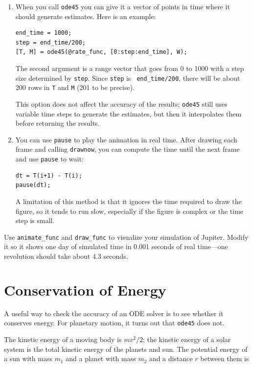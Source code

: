 \documentclass{book}
\begin{document}
\begin{enumerate}

\item When you call {\tt ode45} you can give it a vector of
points in time where it should generate estimates.  Here is
an example:

\begin{verbatim}
end_time = 1000;
step = end_time/200;
[T, M] = ode45(@rate_func, [0:step:end_time], W);
\end{verbatim}

The second argument is a range vector that goes from 0 to 1000 with a
step size determined by {\tt step}.  Since {\tt step} is {\tt
end\_time/200}, there will be about 200 rows in {\tt T} and {\tt M}
(201 to be precise).

This option does not affect the accuracy of the results; {\tt ode45}
still uses variable time steps to generate the estimates, but then it
interpolates them before returning the results.

\item You can use {\tt pause} to play the animation in
real time.  After drawing each frame and calling
{\tt drawnow}, you can compute the time
until the next frame and use {\tt pause} to wait:

\begin{verbatim}
dt = T(i+1) - T(i);
pause(dt);
\end{verbatim}

A limitation of this method is that it ignores the time required to
draw the figure, so it tends to run slow, especially if the figure is
complex or the time step is small.

\end{enumerate}

\begin{ex}
Use {\tt animate\_func} and {\tt draw\_func} to visualize your
simulation of Jupiter.  Modify it so it shows one day of simulated
time in 0.001 seconds of real time---one revolution should take
about 4.3 seconds.
\end{ex}


\section{Conservation of Energy}

A useful way to check the accuracy of an ODE solver is to
see whether it conserves energy.  For planetary
motion, it turns out that {\tt ode45} does not.

The kinetic energy of a moving body is $m v^2 / 2$; the
kinetic energy of a solar system is the total kinetic
energy of the planets and sun.
The potential energy of a sun with mass $m_1$ and a
planet with mass $m_2$ and a distance $r$ between them is
\end{document}
